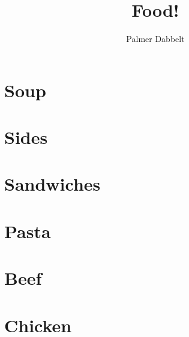 \documentclass{book}
\author{Palmer Dabbelt}
\title{Food!}
\begin{document}
\maketitle
\tableofcontents
\contentsskip

\newcommand{\maketitle}{}
\renewcommand{\tableofcontents}{}
\newcommand{\author}[1]{}
\newcommand{\title}[1]{}
\renewcommand{\contentsskip}{}
\renewcommand{\bref}[1]{\ref{#1}}

\chapter{Soup}



\chapter{Sides}


\chapter{Sandwiches}



\chapter{Pasta}



\chapter{Beef}


\chapter{Chicken}



\end{document}
